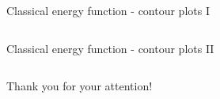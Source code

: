 \documentclass{beamer}
\begin{document}
\begin{frame}{Classical energy function - contour plots I}
    \begin{columns} 


\end{columns}
\end{frame}

\begin{frame}{Classical energy function - contour plots II}
    \begin{columns} 


\end{columns}
\end{frame}


\begin{frame}
\Huge{\centerline{Thank you for your attention!}}
\end{frame}
\end{document}
